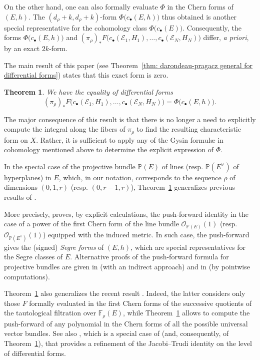 \documentclass[a4paper]{amsart}
\theoremstyle{plain}%
\newtheorem{introtheorem}{Theorem}
\theoremstyle{definition}
\theoremstyle{remark}
\newcommand{\PP}{\mathbb{P}}
\newcommand{\FF}{\mathbb{F}}
\begin{document}
	On the other hand, one can also formally evaluate $ \Phi $ in the Chern forms of $ (E,h) $.
	The $ (d_\rho + k, d_\rho + k) $-form $ \Phi\bigl(c_\bullet(E,h)\bigr) $ thus obtained is another special representative for the cohomology class $ \Phi\bigl(c_\bullet(E)\bigr) $.
	Consequently, the forms $ \Phi\bigl(c_\bullet(E,h)\bigr) $ and $ (\pi_{\rho})_{*} F \bigl( c_{\bullet}(\mathcal{E}_{1},H_1),\dots,c_{\bullet}(\mathcal{E}_{N},H_N) \bigr) $ differ, \textsl{a priori}, by an exact $2k$-form.
	
	The main result of this paper (see Theorem~\ref{thm: darondeau-pragacz general for differential forms}) states that this exact form is zero.
	\begin{introtheorem}\label{introthm:pushgeneral}
		We have the equality of differential forms
		\[
		(\pi_{\rho})_{*} F \bigl( c_{\bullet}(\mathcal{E}_{1},H_1),\dots,c_{\bullet}(\mathcal{E}_{N},H_N) \bigr) = \Phi\bigl(c_\bullet(E,h)\bigr) .
		\]
	\end{introtheorem}
	The major consequence of this result is that there is no longer a need to explicitly compute the integral along the fibers of $ \pi_{\rho} $ to find the resulting characteristic form on $ X $.
	Rather, it is sufficient to apply any of the Gysin formul{\ae} in cohomology mentioned above to determine the explicit expression of $ \Phi $.
	
	In the special case of the projective bundle $ \PP(E) $ of lines (resp. $ \PP(E^{\vee}) $ of hyperplanes) in $ E $, which, in our notation, corresponds to the sequence $ \rho $ of dimensions $ (0,1,r) $ (resp. $ (0,r-1,r) $), Theorem~\ref{introthm:pushgeneral} generalizes previous results of \cite{Mou04,Gul12,Div16}.
	
	More precisely, \cite[Proposition~6]{Mou04} proves, by explicit calculations, the push-forward identity in the case of a power of the first Chern form of the line bundle $ \mathcal{O}_{\PP(E)}(1) $ (resp. $ \mathcal{O}_{\PP(E^{\vee})}(1) $) equipped with the induced metric.
	In such case, the push-forward gives the (signed) \emph{Segre forms} of $ (E,h) $, which are special representatives for the Segre classes of $ E $.
	Alternative proofs of the push-forward formula for projective bundles are given in \cite[Proposition~3.1]{Gul12} (with an indirect approach) and in \cite[Proposition~1.1]{Div16} (by pointwise computations).
	
	Theorem~\ref{introthm:pushgeneral} also generalizes the recent result \cite[Main Theorem]{DF20}.
	Indeed, the latter considers only those $ F $ formally evaluated in the first Chern forms of the successive quotients of the tautological filtration over $ \FF_{\rho}(E) $, while Theorem~\ref{introthm:pushgeneral} allows to compute the push-forward of any polynomial in the Chern forms of all the possible universal vector bundles.
	See also \cite[Theorem~{A.2}]{Fin20}, which is a special case of \cite[Main Theorem]{DF20} (and, consequently, of Theorem~\ref{introthm:pushgeneral}), that provides a refinement of the Jacobi--Trudi identity on the level of differential forms.
	
\end{document}
